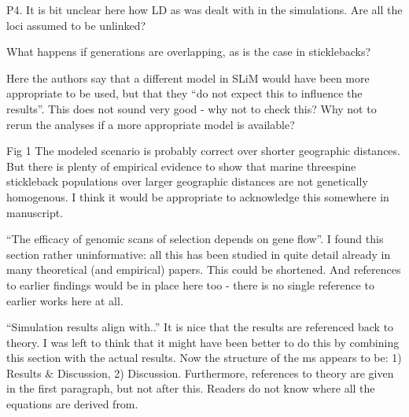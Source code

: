 \reply{
}

\begin{point}{}
P4. It is bit unclear here how LD as was dealt with in the simulations. Are all the loci assumed to be unlinked?
\end{point}

\reply{
}

\begin{point}{\revref}
What happens if generations are overlapping, as is the case in sticklebacks?
\end{point}

\reply{
}

\begin{point}{\revref}
Here the authors say that a different model in SLiM would have been more appropriate to be used, but that they ``do not expect this to influence the results''. This does not sound very good - why not to check this? Why not to rerun the analyses if a more appropriate model is available?
\end{point}

\reply{
}

\begin{point}{Fig 1}
The modeled scenario is probably correct over shorter geographic distances. But there is plenty of empirical evidence to show that marine threespine stickleback populations over larger geographic distances are not genetically homogenous. I think it would be appropriate to acknowledge this somewhere in manuscript.
\end{point}

\reply{
}

\begin{point}{\revref}
``The efficacy of genomic scans of selection depends on gene flow''. I found this section rather uninformative: all this has been studied in quite detail already in many theoretical (and empirical) papers. This could be shortened. And references to earlier findings would be in place here too - there is no single reference to earlier works here at all.
\end{point}

\reply{
}

\begin{point}{\revref}
``Simulation results align with..'' It is nice that the results are referenced back to theory. I was left to think that it might have been better to do this by combining this section with the actual results. Now the structure of the ms appears to be: 1) Results \& Discussion, 2) Discussion. Furthermore, references to theory are given in the first paragraph, but not after this. Readers do not know where all the equations are derived from.
\end{point}

